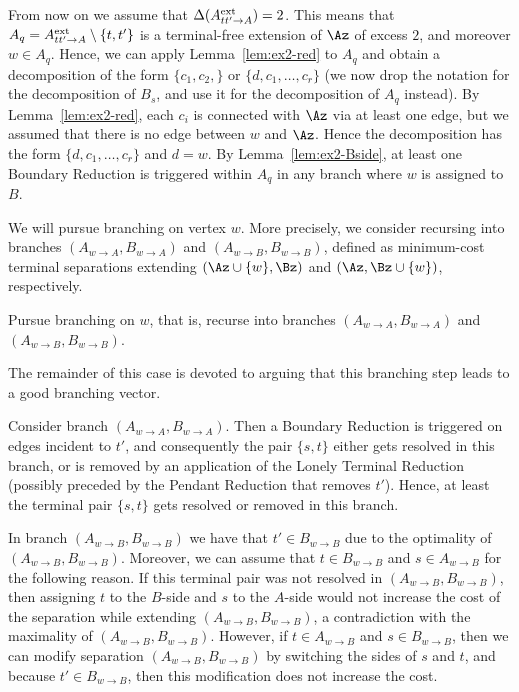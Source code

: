 From now on we assume that $\Delta(A^{\textrm{ext}}_{tt'\to A})=2$. This means that $A_q=A^{\textrm{ext}}_{tt'\to A}\setminus \{t,t'\}$ is a terminal-free extension of $\Az$ of excess $2$, and moreover $w\in A_q$. Hence, we can apply Lemma~\ref{lem:ex2-red} to $A_q$ and obtain a decomposition of the form $\{c_1,c_2,\}$ or $\{d,c_1,\ldots,c_r\}$ (we now drop the notation for the decomposition of $B_s$, and use it for the decomposition of $A_q$ instead). By Lemma~\ref{lem:ex2-red}, each $c_i$ is connected with $\Az$ via at least one edge, but we assumed that there is no edge between $w$ and $\Az$. Hence the decomposition has the form $\{d,c_1,\ldots,c_r\}$ and $d=w$. By Lemma~\ref{lem:ex2-Bside}, at least one Boundary Reduction is triggered within $A_q$ in any branch where $w$ is assigned to $B$.

We will pursue branching on vertex $w$.  More precisely, we consider recursing into branches $(A_{w\to A},B_{w\to A})$ and $(A_{w\to B},B_{w\to B})$, defined as minimum-cost terminal separations extending $(\Az\cup \{w\},\Bz)$ and $(\Az,\Bz\cup \{w\})$, respectively.

\begin{branching}
Pursue branching on $w$, that is, recurse into branches $(A_{w\to A},B_{w\to A})$ and $(A_{w\to B},B_{w\to B})$.
\end{branching}

The remainder of this case is devoted to arguing that this branching step leads to a good branching vector.

Consider branch $(A_{w\to A},B_{w\to A})$. Then a Boundary Reduction is triggered on edges incident to $t'$, and consequently the pair $\{s,t\}$ either gets resolved in this branch, or is removed by an application of the Lonely Terminal Reduction (possibly preceded by the Pendant Reduction that removes $t'$). Hence, at least the terminal pair $\{s,t\}$ gets resolved or removed in this branch. 

In branch $(A_{w\to B},B_{w\to B})$ we have that $t'\in B_{w\to B}$ due to the optimality of $(A_{w\to B},B_{w\to B})$. Moreover, we can assume that $t\in B_{w\to B}$ and $s\in A_{w\to B}$ for the following reason. If this terminal pair was not resolved in $(A_{w\to B},B_{w\to B})$, then assigning $t$ to the $B$-side and $s$ to the $A$-side would not increase the cost of the separation while extending $(A_{w\to B},B_{w\to B})$, a contradiction with the maximality of $(A_{w\to B},B_{w\to B})$. However, if $t\in A_{w\to B}$ and $s\in B_{w\to B}$, then we can modify separation $(A_{w\to B},B_{w\to B})$ by switching the sides of $s$ and $t$, and because $t'\in B_{w\to B}$, then this modification does not increase the cost. 

